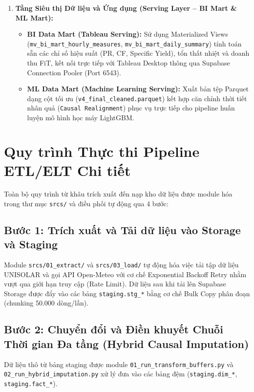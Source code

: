 \documentclass[12pt, a4paper]{report}
\begin{document}
\begin{enumerate}[label=\textbf{Tầng \arabic*:}, leftmargin=*]
    \item \textbf{Tầng Siêu thị Dữ liệu và Ứng dụng (Serving Layer -- BI Mart \& ML Mart):}
    \begin{itemize}[noitemsep]
        \item \textbf{BI Data Mart (Tableau Serving):} Sử dụng Materialized Views (\texttt{mv\_bi\_mart\_hourly\_measures}, \texttt{mv\_bi\_mart\_daily\_summary}) tính toán sẵn các chỉ số hiệu suất (PR, CF, Specific Yield), tổn thất nhiệt và doanh thu FiT, kết nối trực tiếp với Tableau Desktop thông qua Supabase Connection Pooler (Port 6543).
        \item \textbf{ML Data Mart (Machine Learning Serving):} Xuất bản tệp Parquet dạng cột tối ưu (\texttt{v4\_final\_cleaned.parquet}) kết hợp căn chỉnh thời tiết nhân quả (\texttt{Causal Realignment}) phục vụ trực tiếp cho pipeline huấn luyện mô hình học máy LightGBM.
    \end{itemize}
\end{enumerate}

\section{Quy trình Thực thi Pipeline ETL/ELT Chi tiết}
\label{sec:etl_pipeline_steps}

Toàn bộ quy trình từ khâu trích xuất đến nạp kho dữ liệu được module hóa trong thư mục \texttt{srcs/} và điều phối tự động qua 4 bước:

\subsection{Bước 1: Trích xuất và Tải dữ liệu vào Storage và Staging}
Module \texttt{srcs/01\_extract/} và \texttt{srcs/03\_load/} tự động hóa việc tải tập dữ liệu UNISOLAR và gọi API Open-Meteo với cơ chế Exponential Backoff Retry nhằm vượt qua giới hạn truy cập (Rate Limit). Dữ liệu sau khi tải lên Supabase Storage được đẩy vào các bảng \texttt{staging.stg\_*} bằng cơ chế Bulk Copy phân đoạn (chunking 50.000 dòng/lần).

\subsection{Bước 2: Chuyển đổi và Điền khuyết Chuỗi Thời gian Đa tầng (Hybrid Causal Imputation)}
Dữ liệu thô từ bảng staging được module \texttt{01\_run\_transform\_buffers.py} và \texttt{02\_run\_hybrid\_imputation.py} xử lý đưa vào các bảng đệm (\texttt{staging.dim\_*}, \texttt{staging.fact\_*}). 
\end{document}
